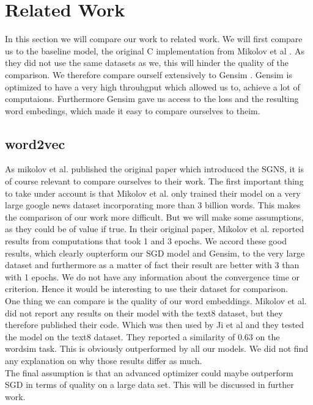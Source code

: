 \section{Related Work}
In this section we will compare our work to related work. We will first compare us to the baseline model, the original C implementation from Mikolov et al \cite{Mikolov}. As they did not use the same datasets as we, this will hinder the quality of the comparison. We therefore compare ourself extensively to Gensim \cite{gensim}. Gensim is optimized to have a very high throuhgput which allowed us to, achieve a lot of computaions. Furthermore Gensim gave us access to the loss and the resulting word embedings, which made it easy  to compare ourselves to theim. 

\subsection{word2vec}

As mikolov et al. published the original paper which introduced the SGNS, it is of course relevant to compare ourselves to their work. The first important thing to take under account is that Mikolov et al. only trained their model on a very large google news dataset incorporating more than 3 billion words. This makes the comparison of our work more difficult. But we will make some assumptions, as they could be of value if true. 
In their original paper, Mikolov et al. reported results from computations that took 1 and 3 epochs. We accord these good results, which clearly oupterform our SGD model and Gensim, to the very large dataset  and furthermore as a matter of fact their result are better with 3 than with 1 epochs. We do not have any information about the convergence time or criterion. Hence it would be interesting to use their dataset for comparison. \\
One thing we can compare is the quality of our word embeddings. Mikolov et al. did not report any results on their model with the text8 dataset, but they therefore published their code. Which was then used by Ji et al \cite{intel} and they tested the model on the text8 dataset. They reported a similarity of 0.63 on the wordsim task. This is obviously outperformed by all our models. We did not find any explanation on why those results differ as much. \\
The final assumption is that an advanced optimizer could maybe outperform SGD in terms of quality on a large data set. This will be discussed in further work.
 


